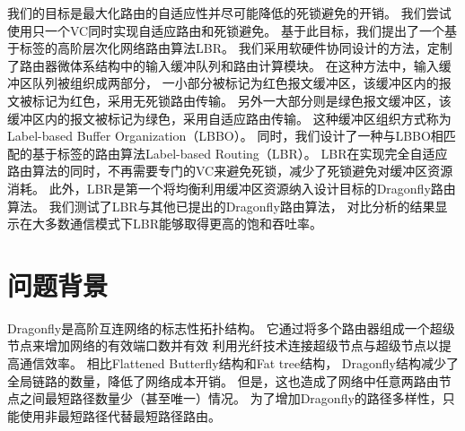 我们的目标是最大化路由的自适应性并尽可能降低的死锁避免的开销。
我们尝试使用只一个VC同时实现自适应路由和死锁避免。
基于此目标，我们提出了一个基于标签的高阶层次化网络路由算法LBR。
我们采用软硬件协同设计的方法，定制了路由器微体系结构中的输入缓冲队列和路由计算模块。
在这种方法中，输入缓冲区队列被组织成两部分，
一小部分被标记为红色报文缓冲区，该缓冲区内的报文被标记为红色，采用无死锁路由传输。
另外一大部分则是绿色报文缓冲区，该缓冲区内的报文被标记为绿色，采用自适应路由传输。
这种缓冲区组织方式称为Label-based Buffer Organization（LBBO）。
同时，我们设计了一种与LBBO相匹配的基于标签的路由算法Label-based Routing（LBR）。
LBR在实现完全自适应路由算法的同时，不再需要专门的VC来避免死锁，减少了死锁避免对缓冲区资源消耗。
此外，LBR是第一个将均衡利用缓冲区资源纳入设计目标的Dragonfly路由算法。
我们测试了LBR与其他已提出的Dragonfly路由算法，
对比分析的结果显示在大多数通信模式下LBR能够取得更高的饱和吞吐率。

\section{问题背景}

Dragonfly是高阶互连网络的标志性拓扑结构。
它通过将多个路由器组成一个超级节点来增加网络的有效端口数并有效
利用光纤技术连接超级节点与超级节点以提高通信效率。
相比Flattened Butterfly结构和Fat tree结构，
Dragonfly结构减少了全局链路的数量，降低了网络成本开销。
但是，这也造成了网络中任意两路由节点之间最短路径数量少（甚至唯一）情况。
为了增加Dragonfly的路径多样性，只能使用非最短路径代替最短路径路由。

